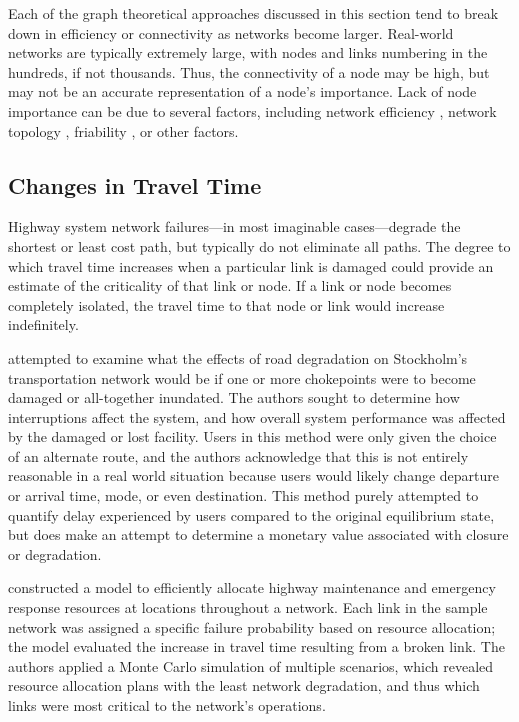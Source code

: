 Each of the graph theoretical approaches discussed in this section tend to break
down in efficiency or connectivity as networks become larger. Real-world
networks are typically extremely large, with nodes and links numbering in the
hundreds, if not thousands. Thus, the connectivity of a node may be high, but may
not be an accurate representation of a node's importance. Lack of node importance
can be due to several factors, including network efficiency \citep{osei2014}, network topology \citep{zhang2015},
friability \citep{ip2011}, or other factors.

\subsection{Changes in Travel Time}

Highway system network failures---in most imaginable cases---degrade
the
shortest or least cost path, but typically do not eliminate all paths.
The degree
to which travel time increases when a particular link is damaged could
provide an estimate of the criticality of that link or node. If a link or node
becomes completely isolated, the travel time to that node or link would
increase indefinitely.

\citet{Berdica2007} attempted to examine what the effects of road
degradation on Stockholm's transportation network would be if one or more
chokepoints were to become damaged or all-together inundated. The authors
sought to determine how interruptions affect the system, and how overall
system performance was affected by the damaged or lost facility. Users in this method were only given the
choice of an alternate route, and the authors acknowledge that this is not
entirely reasonable in a real world situation because users would likely change
departure or arrival time, mode, or even destination. This method purely attempted
to quantify delay experienced by users compared to the original
equilibrium state, but does make an attempt to determine a monetary value
associated with closure or degradation.

\citet{peeta2010} constructed a model to efficiently allocate
highway maintenance and emergency response resources at locations throughout a
network. Each link in the sample network was
assigned a specific failure probability based on resource allocation;
the model evaluated the increase in travel time resulting from a broken
link. The authors applied a Monte Carlo simulation of multiple scenarios,
which revealed resource allocation plans with the least network degradation,
and thus which links were most critical to the network's operations.


